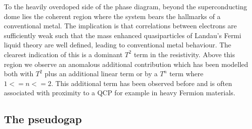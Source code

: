 To the heavily overdoped side of the phase diagram, beyond the superconducting dome lies the coherent region where the system bears the hallmarks of a conventional metal. The implication is that correlations between electrons are sufficiently weak such that the mass enhanced quasiparticles of Landau's Fermi liquid theory are well defined, leading to conventional metal behaviour. The clearest indication of this is a dominant $T^2$ term in the resistivity. Above this region we observe an anomalous additional contribution which has been modelled both with $T^2$ plus an additional linear term or by a $T^n$ term where $1 <= n <= 2$. This additional term has been observed before and is often associated with proximity to a \ac{QCP} for example in heavy Fermion materials.

\subsection{The pseudogap}

